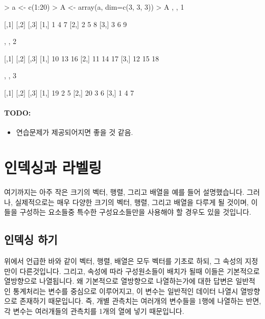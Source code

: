 \documentclass[tutorial.tex]{subfiles}
\begin{document}

\begin{Schunk}
\begin{Soutput}

> a <- c(1:20)
> A <- array(a, dim=c(3, 3, 3))
> A
, , 1

     [,1] [,2] [,3]
[1,]    1    4    7
[2,]    2    5    8
[3,]    3    6    9

, , 2

     [,1] [,2] [,3]
[1,]   10   13   16
[2,]   11   14   17
[3,]   12   15   18

, , 3

     [,1] [,2] [,3]
[1,]   19    2    5
[2,]   20    3    6
[3,]    1    4    7
\end{Soutput}
\end{Schunk}

\paragraph{TODO:}
\begin{itemize}
	\item 연습문제가 제공되어지면 좋을 것 같음. 
\end{itemize}


%
%
%


\section{인덱싱과 라벨링}

여기까지는 아주 작은 크기의 벡터, 행렬, 그리고 배열을 예를 들어 설명했습니다.
그러나, 실제적으로는 매우 다양한 크기의 벡터, 행렬, 그리고 배열을 다루게 될 것이며, 이들을 구성하는 요소들중 특수한 구성요소들만을 사용해야 할 경우도 있을 것입니다.  

\subsection{인덱싱 하기}

위에서 언급한 바와 같이 벡터, 행렬, 배열은 모두 벡터를 기초로 하되, 그 속성의 지정만이 다른것입니다.
그리고, 속성에 따라 구성원소들이 배치가 될때 이들은 기본적으로 열방향으로 나열됩니다. 
왜 기본적으로 열방향으로 나열하는가에 대한 답변은 일반적인 통계처리는 변수를 중심으로 이루어지고, 이 변수는 일반적인 데이터 나열시 열방향으로 존재하기 때문입니다. 
즉, 개별 관측치는 여러개의 변수들을 1행에 나열하는 반면, 각 변수는 여러개들의 관측치를 1개의 열에 넣기 때문입니다.
\end{document}
